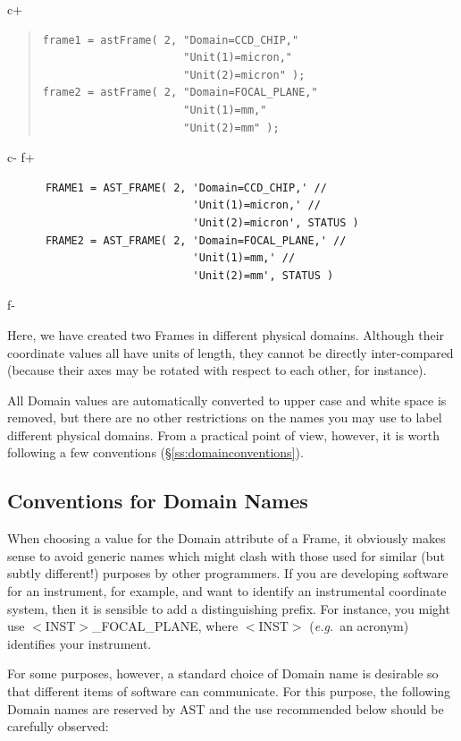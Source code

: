 \documentclass[twoside,11pt]{article}
\newcommand{\secref}[1]{\S\ref{#1}}
\newcommand{\secref}[1]{\ref{#1}}
\begin{document}
c+
\begin{quote}
\small
\begin{verbatim}
frame1 = astFrame( 2, "Domain=CCD_CHIP,"
                      "Unit(1)=micron,"
                      "Unit(2)=micron" );
frame2 = astFrame( 2, "Domain=FOCAL_PLANE,"
                      "Unit(1)=mm,"
                      "Unit(2)=mm" );
\end{verbatim}
\normalsize
\end{quote}
c-
f+
\small
\begin{verbatim}
      FRAME1 = AST_FRAME( 2, 'Domain=CCD_CHIP,' //
                             'Unit(1)=micron,' //
                             'Unit(2)=micron', STATUS )
      FRAME2 = AST_FRAME( 2, 'Domain=FOCAL_PLANE,' //
                             'Unit(1)=mm,' //
                             'Unit(2)=mm', STATUS )
\end{verbatim}
\normalsize
f-

Here, we have created two Frames in different physical
domains. Although their coordinate values all have units of length,
they cannot be directly inter-compared (because their axes may be
rotated with respect to each other, for instance).

All Domain values are automatically converted to upper case and white
space is removed, but there are no other restrictions on the names you
may use to label different physical domains. From a practical point of
view, however, it is worth following a few conventions
(\secref{ss:domainconventions}).

\subsection{\label{ss:domainconventions}Conventions for Domain Names}

When choosing a value for the Domain attribute of a Frame, it
obviously makes sense to avoid generic names which might clash with
those used for similar (but subtly different!) purposes by other
programmers. If you are developing software for an instrument, for
example, and want to identify an instrumental coordinate system, then
it is sensible to add a distinguishing prefix. For instance, you might
use $<$INST$>$\_FOCAL\_PLANE, where $<$INST$>$ ({\em{e.g.}}\ an
acronym) identifies your instrument.

For some purposes, however, a standard choice of Domain name is
desirable so that different items of software can communicate. For
this purpose, the following Domain names are reserved by AST and the
use recommended below should be carefully observed:
\end{document}
